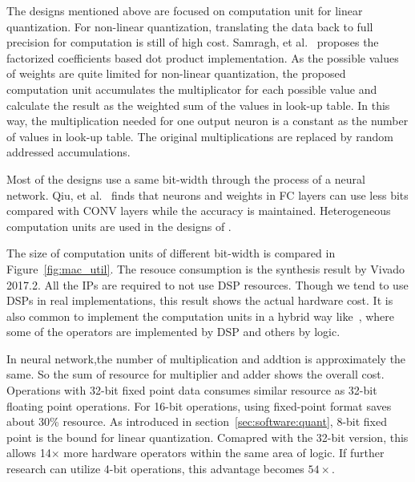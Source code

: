 The designs mentioned above are focused on computation unit for linear quantization. For non-linear quantization, translating the data back to full precision for computation is still of high cost. Samragh, et al.~\cite{samragh2017customizing} proposes the factorized coefficients based dot product implementation. As the possible values of weights are quite limited for non-linear quantization, the proposed computation unit accumulates the multiplicator for each possible value and calculate the result as the weighted sum of the values in look-up table. In this way, the multiplication needed for one output neuron is a constant as the number of values in look-up table. The original multiplications are replaced by random addressed accumulations.

Most of the designs use a same bit-width through the process of a neural network. Qiu, et al.~\cite{qiu2016going} finds that neurons and weights in FC layers can use less bits compared with CONV layers while the accuracy is maintained. Heterogeneous computation units are used in the designs of \cite{zhao2017accelerating, guo2017bit}.

The size of computation units of different bit-width is compared in Figure~\ref{fig:mac_util}. The resouce consumption is the synthesis result by Vivado 2017.2. All the IPs are required to not use DSP resources. Though we tend to use DSPs in real implementations, this result shows the actual hardware cost. It is also common to implement the computation units in a hybrid way like~\cite{qiu2016going}, where some of the operators are implemented by DSP and others by logic.

In neural network,the number of multiplication and addtion is approximately the same. So the sum of resource for multiplier and adder shows the overall cost. Operations with 32-bit fixed point data consumes similar resource as 32-bit floating point operations. For 16-bit operations, using fixed-point format saves about 30\% resource. As introduced in section~\ref{sec:software:quant}, 8-bit fixed point is the bound for linear quantization. Comapred with the 32-bit version, this allows 14$\times$ more hardware operators within the same area of logic. If further research can utilize 4-bit operations, this advantage becomes $54\times$.

